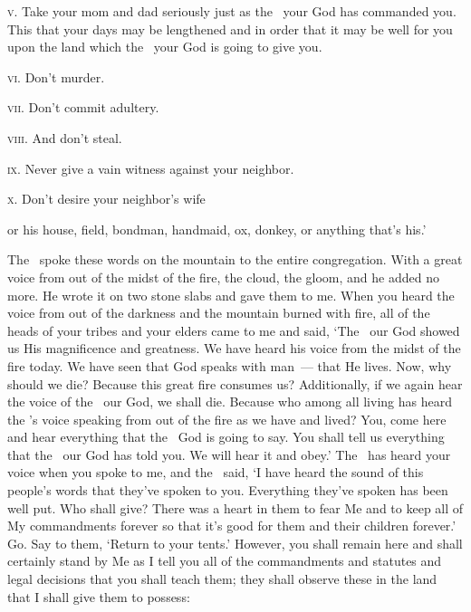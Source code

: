 \begin{inparaenum}
   \textsc{v.} Take your mom and dad seriously just as the \lord\ your God has commanded you. This that your days may be lengthened and in order that it may be well for you upon the land which the \lord\ your God is going to give you.%

   \textsc{vi.} Don't murder.%

   \textsc{vii.} Don't commit adultery.%

   \textsc{viii.} And don't steal.%

   \textsc{ix.} Never give a vain witness against your neighbor.%

   \textsc{x.} Don't desire your neighbor's wife

  or his house, field, bondman, handmaid, ox, donkey, or anything that's his.'%

   The \lord\ spoke these words on the mountain to the entire congregation. With a great voice from out of the midst of the fire, the cloud, the gloom, and he added no more. He wrote it on two stone slabs and gave them to me.%
   When you heard the voice from out of the darkness and the mountain burned with fire, all of the heads of your tribes and your elders came to me%
   and said, `The \lord\ our God showed us His magnificence and greatness. We have heard his voice from the midst of the fire today. We have seen that God speaks with man~--- that He lives.%
   Now, why should we die? Because this great fire consumes us? Additionally, if we again hear the voice of the \lord\ our God, we shall die.%
   Because who among all living has heard the \lord's voice speaking from out of the fire as we have and lived?%
   You, come here and hear everything that the \lord\ God is going to say. You shall tell us everything that the \lord\ our God has told you. We will hear it and obey.'%
   The \lord\ has heard your voice when you spoke to me, and the \lord\ said, `I have heard the sound of this people's words that they've spoken to you. Everything they've spoken has been well put.%
   Who shall give? There was a heart in them to fear Me and to keep all of My commandments forever so that it's good for them and their children forever.'%
   Go. Say to them, `Return to your tents.'%
   However, you shall remain here and shall certainly stand by Me as I tell you all of the commandments and statutes and legal decisions that you shall teach them; they shall observe these in the land that I shall give them to possess:%
\end{inparaenum}
